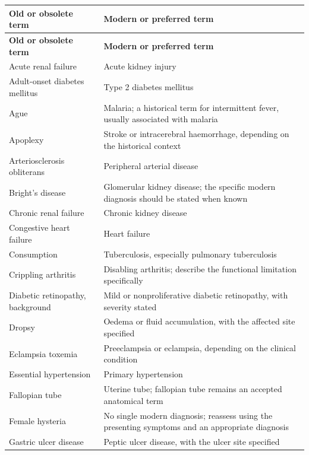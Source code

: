 \small
\setlength{\LTleft}{0pt}
\setlength{\LTright}{0pt}
\begin{longtable}{>{\raggedright\arraybackslash}p{} >{\raggedright\arraybackslash}p{}}
\toprule
\textbf{Old or obsolete term} & \textbf{Modern or preferred term} \\
\midrule
\endfirsthead
\toprule
\textbf{Old or obsolete term} & \textbf{Modern or preferred term} \\
\midrule
\endhead
\bottomrule
\endfoot

Acute renal failure & Acute kidney injury \\
Adult-onset diabetes mellitus & Type 2 diabetes mellitus \\
Ague & Malaria; a historical term for intermittent fever, usually associated with malaria \\
Apoplexy & Stroke or intracerebral haemorrhage, depending on the historical context \\
Arteriosclerosis obliterans & Peripheral arterial disease \\
Bright's disease & Glomerular kidney disease; the specific modern diagnosis should be stated when known \\
Chronic renal failure & Chronic kidney disease \\
Congestive heart failure & Heart failure \\
Consumption & Tuberculosis, especially pulmonary tuberculosis \\
Crippling arthritis & Disabling arthritis; describe the functional limitation specifically \\
Diabetic retinopathy, background & Mild or nonproliferative diabetic retinopathy, with severity stated \\
Dropsy & Oedema or fluid accumulation, with the affected site specified \\
Eclampsia toxemia & Preeclampsia or eclampsia, depending on the clinical condition \\
Essential hypertension & Primary hypertension \\
Fallopian tube & Uterine tube; fallopian tube remains an accepted anatomical term \\
Female hysteria & No single modern diagnosis; reassess using the presenting symptoms and an appropriate diagnosis \\
Gastric ulcer disease & Peptic ulcer disease, with the ulcer site specified \\

\end{longtable}
